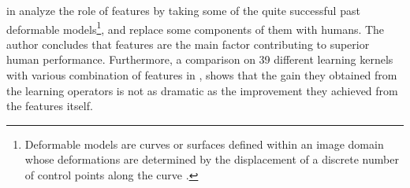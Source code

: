 \citeauthor*{parikh2010role} in \cite{parikh2010role} analyze the role of features by taking some of the quite successful past deformable models\footnote{Deformable models are curves or surfaces defined within an image domain whose deformations are determined by the displacement of a discrete number of control points along the curve \cite{xu2000image}.}, and replace some components of them with humans. The author concludes that features are the main factor contributing to superior human performance. Furthermore, a comparison on 39 different learning kernels with various combination of features in \cite{gehler2009feature}, shows that the gain they obtained from the learning operators is not as dramatic as the improvement they achieved from the features itself.



